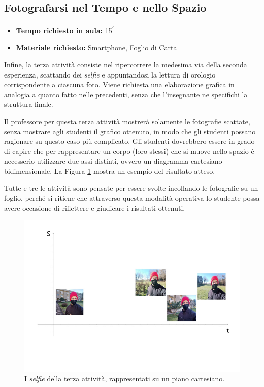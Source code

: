 \documentclass{report} \usepackage[T1]{fontenc} \usepackage[italian]{babel}
\begin{document}
\subsection{Fotografarsi nel Tempo e nello Spazio}

\begin{itemize}
\item \textbf{Tempo richiesto in aula:} 15\textsuperscript{$\prime$}
\item \textbf{Materiale richiesto:} Smartphone, Foglio di Carta
\end{itemize}

Infine, la terza attività consiste nel ripercorrere la medesima via della
seconda esperienza, scattando dei \emph{selfie} e appuntandosi la lettura di orologio
corrispondente a ciascuna foto. Viene richiesta una elaborazione grafica in
analogia a quanto fatto nelle precedenti, senza che l’insegnante ne specifichi
la struttura finale.

Il professore per questa terza attività mostrerà solamente le fotografie
scattate, senza mostrare agli studenti il grafico ottenuto, in modo che gli
studenti possano ragionare su questo caso più complicato.
Gli studenti dovrebbero essere in grado di capire che per rappresentare
un corpo (loro stessi) che si muove nello spazio è necesserio utilizzare
due assi distinti, ovvero un diagramma cartesiano bidimensionale.
La Figura \ref{fig:piano_s_t} mostra un esempio del risultato atteso.

Tutte e tre le attività sono pensate per essere svolte incollando le fotografie
su un foglio, perché si ritiene che attraverso questa modalità operativa lo
studente  possa avere occasione di riflettere e giudicare i risultati ottenuti.
\begin{figure}[ht]
\centering
  \includegraphics[width=\textwidth]{piano_s_t}
  \caption{I \emph{selfie} della terza attività, rappresentati
           su un piano cartesiano.}
  \label{fig:piano_s_t}
\end{figure}
\end{document}
